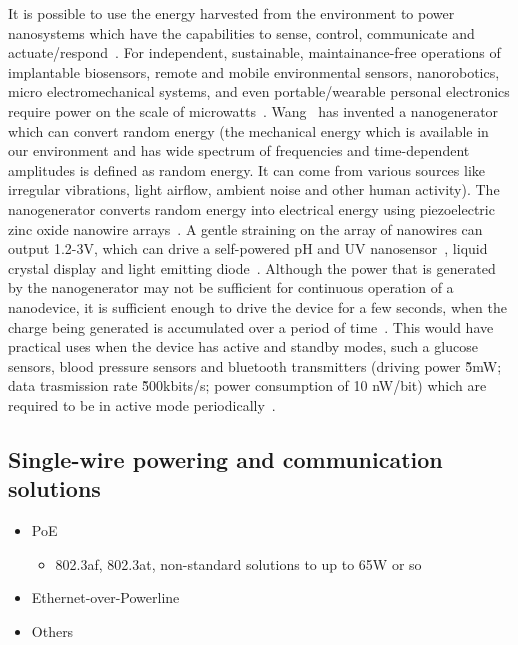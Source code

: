 \documentclass[final]{siamltex}
\begin{document}
It is possible to use the energy harvested from the environment to power
nanosystems which have the capabilities to sense, control, communicate and
actuate/respond~\cite{wang2010toward}. For independent, sustainable,
maintainance-free operations of implantable biosensors, remote and mobile
environmental sensors, nanorobotics, micro electromechanical systems, and even
portable/wearable personal electronics require power on the scale of
microwatts~\cite{wang2010toward}. Wang~\cite{wang2010toward} has invented a
nanogenerator which can convert random energy (the mechanical energy which is
available in our environment and has wide spectrum of frequencies and
time-dependent amplitudes is defined as random energy. It can come from various
sources like irregular vibrations, light airflow, ambient noise and other human
activity). The nanogenerator converts random energy into electrical energy using
piezoelectric zinc oxide nanowire
arrays~\cite{wang2006piezoelectric}\cite{yang2009converting}. A gentle straining
on the array of nanowires can output 1.2-3V, which can drive a self-powered pH
and UV nanosensor~\cite{xu2010self}, liquid crystal display and light emitting
diode~\cite{xu2010piezoelectric}\cite{zhu2010flexible}. Although the power that
is generated by the nanogenerator may not be sufficient for continuous operation
of a nanodevice, it is sufficient enough to drive the device for a few seconds,
when the charge being generated is accumulated over a period of
time~\cite{wang2010toward}. This would have practical uses when the device has
active and standby modes, such a glucose sensors, blood pressure sensors and
bluetooth transmitters (driving power \~5mW; data trasmission rate \~500kbits/s;
power consumption of 10 nW/bit) which are required to be in active mode
periodically~\cite{wang2010toward}.

\subsection{Single-wire powering and communication solutions}

\begin{itemize}
  \item PoE
    \begin{itemize}
    \item 802.3af, 802.3at, non-standard solutions to up to 65W or so
    \end{itemize}
  \item Ethernet-over-Powerline
  \item Others
\end{itemize}
 
\end{document}
